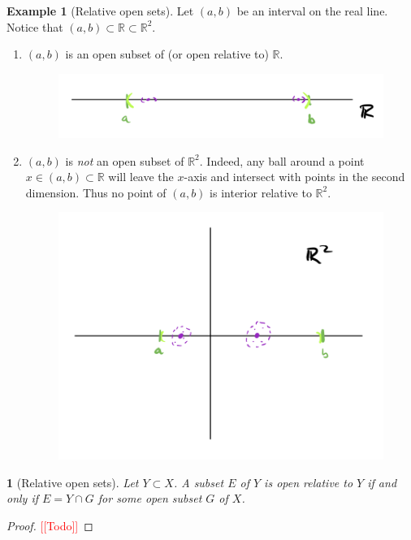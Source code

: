 \documentclass[11pt]{article}
\numberwithin{equation}{section}
\theoremstyle{plain}
\newtheorem{theorem}{\color{ForestGreen}{\textbf{Theorem}}}[section]
\theoremstyle{definition}
\newtheorem{example}{\color{WildStrawberry}Example}[section]
\newcommand{\1}{\mathbbm 1}
\newcommand{\RR}{\mathbb R}
\begin{document}
\begin{example}[Relative open sets]
	Let $(a,b)$ be an interval on the real line. Notice that $(a,b) \subset \RR \subset \RR^2$.
	\begin{enumerate}
		\item $(a,b)$ is an open subset of (or open relative to) $\RR$.
		\begin{figure}[H]
			\begin{center}
				\includegraphics[scale=.75]{open_relative_r.png}
			\end{center}
		\end{figure}
		\item $(a,b)$ is \emph{not} an open subset of $\RR^2$. Indeed, any ball around a point $x \in (a,b) \subset \RR$ will leave the $x$-axis and intersect with points in the second dimension. Thus no point of $(a,b)$ is interior relative to $\RR^2$.
		\begin{figure}[H]
			\begin{center}
				\includegraphics[scale=.75]{open_relative_r2.png}
			\end{center}
		\end{figure}  
	\end{enumerate}
\end{example}


\begin{theorem}[Relative open sets]
	Let $Y \subset X$. A subset $E$ of $Y$ is open relative to $Y$ if and only if $E = Y \cap G$ for some open subset $G$ of $X$. 
\end{theorem}
\begin{proof}
	\textcolor{red}{[[Todo]]}
\end{proof}
\end{document}
